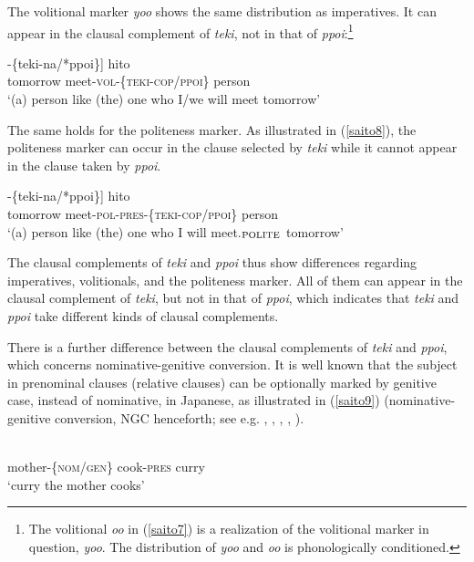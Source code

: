 \documentclass[output=paper]{langscibook}
\begin{document}
The volitional marker \emph{yoo} shows the same distribution as imperatives. It can appear in the clausal complement of \emph{teki}, not in that of \emph{ppoi}:\footnote{The volitional \emph{oo} in (\ref{saito7}) is a realization of the volitional marker in question, \emph{yoo}. The distribution of \emph{yoo} and \emph{oo} is phonologically conditioned.}


\begin{exe}
\ex \label{saito7}
\gll [[{asita} {a-oo}]-\{{teki-na/*ppoi}\}] {hito}\\
tomorrow meet-\textsc{vol}-\{\textsc{teki-cop/ppoi}\} person\\ 
\glt ‘(a) person like (the) one who I/we will meet tomorrow’
\end{exe}

The same holds for the politeness marker. As illustrated in (\ref{saito8}), the politeness marker can occur in the clause selected by \emph{teki} while it cannot appear in the clause taken by \emph{ppoi}.

\begin{exe}
\ex \label{saito8}
\gll [[{asita} {ai-mas-u}]-\{{teki-na/*ppoi}\}] {hito}\\
tomorrow meet-\textsc{pol-pres}-\{\textsc{teki-cop/ppoi}\} person\\ 
\glt ‘(a) person like (the) one who I will meet.$_{\textnormal{POLITE}}$ tomorrow’
\end{exe}

The clausal complements of \emph{teki} and \emph{ppoi} thus show differences regarding imperatives, volitionals, and the politeness marker. All of them can appear in the clausal complement of \emph{teki}, but not in that of \emph{ppoi}, which indicates that \emph{teki} and \emph{ppoi} take different kinds of clausal complements.

There is a further difference between the clausal complements of \emph{teki} and \emph{ppoi}, which concerns nominative-genitive conversion. It is well known that the subject in prenominal clauses (relative clauses) can be optionally marked by genitive case, instead of nominative, in Japanese, as illustrated in (\ref{saito9}) (nominative-genitive conversion, NGC henceforth; see e.g. \citealt{Harada1971}, \citealt{Watanabe1996a}, \citealt{Hiraiwa2000,hiraiwa2005}, \citealt{MakiUchibori2008}, \citealt{miyagawa2011}).

\begin{exe}
\ex \label{saito9}
\\
mother-\{\textsc{nom/gen}\} cook-\textsc{pres} curry\\ 
\glt ‘curry the mother cooks’
\end{exe}
\end{document}
